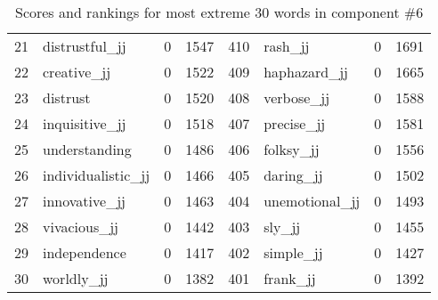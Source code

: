 \begin{table}[tbp]
\begin{tabular}{| rlr@{.}l | rlr@{.}l |}
    21 & distrustful\_jj & 0 & 1547    &    410 & rash\_jj & 0 & 1691 \\
    22 & creative\_jj & 0 & 1522    &    409 & haphazard\_jj & 0 & 1665 \\
    23 & distrust & 0 & 1520    &    408 & verbose\_jj & 0 & 1588 \\
    24 & inquisitive\_jj & 0 & 1518    &    407 & precise\_jj & 0 & 1581 \\
    25 & understanding & 0 & 1486    &    406 & folksy\_jj & 0 & 1556 \\
    26 & individualistic\_jj & 0 & 1466    &    405 & daring\_jj & 0 & 1502 \\
    27 & innovative\_jj & 0 & 1463    &    404 & unemotional\_jj & 0 & 1493 \\
    28 & vivacious\_jj & 0 & 1442    &    403 & sly\_jj & 0 & 1455 \\
    29 & independence & 0 & 1417    &    402 & simple\_jj & 0 & 1427 \\
    30 & worldly\_jj & 0 & 1382    &    401 & frank\_jj & 0 & 1392 \\
    \hline
    \end{tabular}
    \caption{Scores and rankings for most extreme 30 words in component \#6} 
\end{table}
\clearpage
